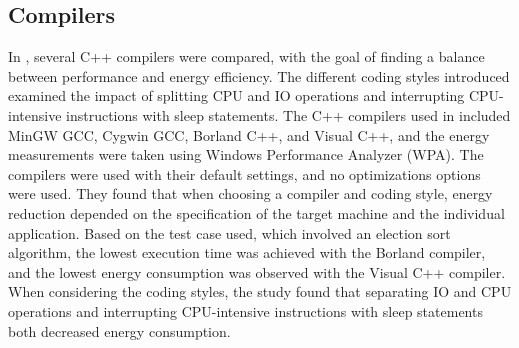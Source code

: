 \subsection{Compilers}
In \cite{hassan2017}, several C++ compilers were compared, with the goal of finding a balance between performance and energy efficiency. The different coding styles introduced examined the impact of splitting CPU and IO operations and interrupting CPU-intensive instructions with sleep statements. The C++ compilers used in \cite{hassan2017} included MinGW GCC, Cygwin GCC, Borland C++, and Visual C++, and the energy measurements were taken using Windows Performance Analyzer (WPA). The compilers were used with their default settings, and no optimizations options were used. %
 They found that when choosing a compiler and coding style, energy reduction depended on the specification of the target machine and the individual application. Based on the test case used, which involved an election sort algorithm, the lowest execution time was achieved with the Borland compiler, and the lowest energy consumption was observed with the Visual C++ compiler. When considering the coding styles, the study found that separating IO and CPU operations and interrupting CPU-intensive instructions with sleep statements both decreased energy consumption.